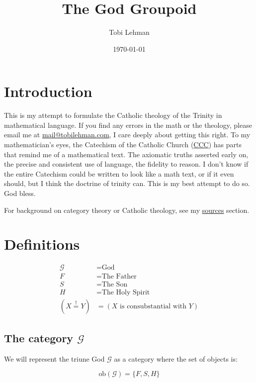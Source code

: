 \documentclass[11pt]{article}
\author{Tobi Lehman}
\date{\today}
\title{The God Groupoid}
\begin{document}
\maketitle
\tableofcontents

\section{Introduction}
\label{sec:introduction}

This is my attempt to formulate the Catholic theology of the Trinity in mathematical language. If you find any errors in the math or the theology, please email me at \href{mailto:mail@tobilehman.com}{mail@tobilehman.com}, I care deeply about getting this right. To my mathematician's eyes, the Catechism of the Catholic Church (\href{https://www.vatican.va/archive/ENG0015/_INDEX.HTM}{CCC}) has parts that remind me of a mathematical text. The axiomatic truths asserted early on, the precise and consistent use of language, the fidelity to reason. I don't know if the entire Catechism could be written to look like a math text, or if it even should, but I think the doctrine of trinity can. This is my best attempt to do so. God bless.

For background on category theory or Catholic theology, see my \hyperref[sec:sources]{sources} section.

\section{Definitions}
\label{sec:definitions}

\begin{align}
\mathcal{G} &= \text{God} \\
F &= \text{The Father}\\
S &= \text{The Son} \\
H &= \text{The Holy Spirit} \\
(X \stackrel{\dagger}{=} Y) &= (X \text{ is consubstantial with } Y)
\end{align}

\subsection{The category $\mathcal{G}$}
\label{sec:category-g}

We will represent the triune God $\mathcal{G}$ as a category where the set of objects is:

$$\text{ob}(\mathcal{G}) = \{F,S,H\}$$
\end{document}
